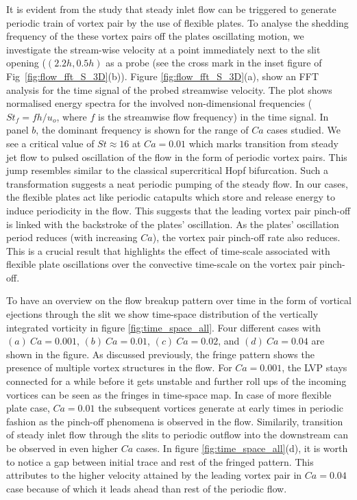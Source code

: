 \documentclass[final,3p,times,authoryear]{elsarticle}
\begin{document}
It is evident from the study that steady inlet flow can be triggered to generate periodic train of vortex pair by the use of flexible plates. To analyse the shedding frequency of the these vortex pairs off the plates oscillating motion, we investigate the stream-wise velocity at a point immediately next to the slit opening ($(2.2h,0.5h)$ as a probe (see the cross mark in the inset figure of Fig~\ref{fig:flow_fft_S_3D}(b)). %
Figure \ref{fig:flow_fft_S_3D}(a), show an FFT analysis for the time signal of the probed streamwise velocity. The plot shows normalised energy spectra for the involved non-dimensional frequencies ($St_f=fh/u_{o}$, where $f$ is the streamwise flow frequency) in the time signal. In panel $b$, the dominant frequency is shown for the range of $Ca$ cases studied. We see a critical value of $St \approx 16$ at $Ca=0.01$ which marks transition from steady jet flow to pulsed oscillation of the flow in the form of periodic vortex pairs. This jump resembles similar to the classical supercritical Hopf bifurcation. Such a transformation suggests a neat periodic pumping of the steady flow. In our cases, the flexible plates act like periodic catapults which store and release energy to induce periodicity in the flow. This suggests that the leading vortex pair pinch-off is linked with the backstroke of the plates' oscillation. As the plates' oscillation period reduces (with increasing $Ca$), the vortex pair pinch-off rate also reduces. This is a crucial result that highlights the effect of time-scale associated with flexible plate oscillations over the convective time-scale on the vortex pair pinch-off.

To have an overview on the flow breakup pattern over time in the form of vortical ejections through the slit we show time-space distribution of the vertically integrated vorticity in figure \ref{fig:time_space_all}. Four different cases with $(a)\ Ca=0.001$, $(b)\ Ca=0.01$, $(c)\ Ca=0.02$, and $(d)\ Ca=0.04$ are shown in the figure. As discussed previously, the fringe pattern shows the presence of multiple vortex structures in the flow. For $Ca=0.001$, the LVP stays connected for a while before it gets unstable and further roll ups of the incoming vortices can be seen as the fringes in time-space map. In case of more flexible plate case, $Ca=0.01$ the subsequent vortices generate at early times in periodic fashion as the pinch-off phenomena is observed in the flow. Similarily, transition of steady inlet flow through the slits to periodic outflow into the downstream can be observed in even higher $Ca$ cases. In figure \ref{fig:time_space_all}(d), it is worth to notice a gap between initial trace and rest of the fringed pattern. This attributes to the higher velocity attained by the leading vortex pair in $Ca=0.04$ case because of which it leads ahead than rest of the periodic flow.
\end{document}
